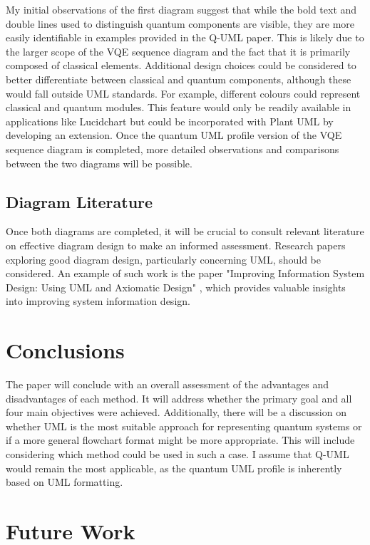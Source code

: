 \documentclass{article}
\begin{document}
My initial observations of the first diagram suggest that while the bold text and double lines used to distinguish quantum components are visible, they are more easily identifiable in examples provided in the Q-UML paper. This is likely due to the larger scope of the VQE sequence diagram and the fact that it is primarily composed of classical elements.
Additional design choices could be considered to better differentiate between classical and quantum components, although these would fall outside UML standards. For example, different colours could represent classical and quantum modules. This feature would only be readily available in applications like Lucidchart but could be incorporated with Plant UML by developing an extension.
Once the quantum UML profile version of the VQE sequence diagram is completed, more detailed observations and comparisons between the two diagrams will be possible.

\subsection{Diagram Literature}

Once both diagrams are completed, it will be crucial to consult relevant literature on effective diagram design to make an informed assessment. Research papers exploring good diagram design, particularly concerning UML, should be considered. An example of such work is the paper "Improving Information System Design: Using UML and Axiomatic Design" \cite{CAVIQUE2022103569}, which provides valuable insights into improving system information design.

\section{Conclusions}

The paper will conclude with an overall assessment of the advantages and disadvantages of each method. It will address whether the primary goal and all four main objectives were achieved. Additionally, there will be a discussion on whether UML is the most suitable approach for representing quantum systems or if a more general flowchart format might be more appropriate. This will include considering which method could be used in such a case. I assume that Q-UML would remain the most applicable, as the quantum UML profile is inherently based on UML formatting.

\section{Future Work}
\end{document}
